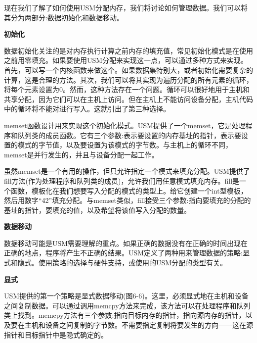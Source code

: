 现在我们了解了如何使用USM分配内存，我们将讨论如何管理数据。我们可以将其分为两部分:数据初始化和数据移动。\par

\hspace*{\fill} \par %
\textbf{初始化}

数据初始化关注的是对内存执行计算之前内存的填充值，常见初始化模式是在使用之前用零填充。如果要使用USM分配来实现这一点，可以通过多种方式来实现。首先，可以写一个内核函数来做这个。如果数据集特别大，或者初始化需要复杂的计算，这是合理的方法。其次，我们可以将其实现为遍历分配的所有元素的循环，将每个元素设置为0。然而，这种方法存在一个问题。循环可以很好地用于主机和共享分配，因为它们可以在主机上访问。但在主机上不能访问设备分配，主机代码中的循环将不能对进行写入。这就引出了第三种选择。\par

memset函数设计用来实现这个初始化模式。USM提供了一个memset，它是处理程序和队列类的成员函数。它有三个参数:表示要设置的内存基址的指针，表示要设置的模式的字节值，以及要设置为该模式的字节数。与主机上的循环不同，memset是并行发生的，并且与设备分配一起工作。\par

虽然memset是一个有用的操作，但只允许指定一个模式来填充分配。USM提供了fill方法(作为处理程序和队列类的成员)，允许我们用任意模式填充内存。fill是一个函数，模板化在我们想要写入分配的模式的类型上。给它创建一个int型模板，然后用数字“42”填充分配。与memset类似，fill接受三个参数:指向要填充的分配的基址的指针，要填充的值，以及希望将该值写入分配的数量。\par

\hspace*{\fill} \par %
\textbf{数据移动}

数据移动可能是USM需要理解的重点。如果正确的数据没有在正确的时间出现在正确的地点，程序将产生不正确的结果。USM定义了两种用来管理数据的策略:显式和隐式。使用策略的选择与硬件支持，或使用的USM分配的类型有关。\par

\hspace*{\fill} \par %
\textbf{显式}

USM提供的第一个策略是显式数据移动(图6-6)。这里，必须显式地在主机和设备之间复制数据。可以通过调用memcpy方法来完成，该方法可以在处理程序和队列类上找到。memcpy方法有三个参数:指向目标内存的指针，指向源内存的指针，以及要在主机和设备之间复制的字节数。不需要指定复制将要发生的方向——这在源指针和目标指针中是隐式确定的。\par

